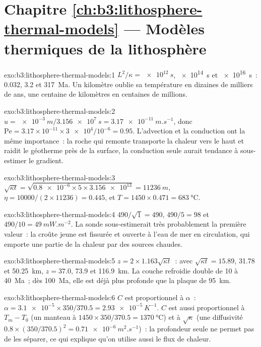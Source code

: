 \section*{Chapitre \ref{ch:b3:lithosphere-thermal-models} --- Modèles thermiques de la lithosphère}

\begin{solution}{exo:b3:lithosphere-thermal-models:1}
$L^2/\kappa = \qty{e12}{s}$, \qty{e14}{s} et \qty{e16}{s}~: 0.032, 3.2 et
\qty{317}{Ma}. Un kilomètre oublie sa température en dizaines de milliers de
ans, une centaine de kilomètres en centaines de millions.
\end{solution}

\begin{solution}{exo:b3:lithosphere-thermal-models:2}
$u = \qty{e-3}{m}/\qty{3.156e7}{s} = \qty{3.17e-11}{m.s^{-1}}$, donc
$\mathrm{Pe} = 3.17\times10^{-11}\times\num{3e4}/10^{-6} = 0.95$. L'advection et
la conduction ont la même importance~: la roche qui remonte transporte la chaleur vers le haut
et raidit le géotherme près de la surface, la conduction seule
aurait tendance à sous-estimer le gradient.
\end{solution}

\begin{solution}{exo:b3:lithosphere-thermal-models:3}
$\sqrt{\kappa t} = \sqrt{\num{0.8e-6}\times5\times\num{3.156e13}} =
\qty{11236}{m}$, $\eta = 10000/(2\times11236) = 0.445$, et $T = 1450\times0.471
= \qty{683}{\celsius}$.
\end{solution}

\begin{solution}{exo:b3:lithosphere-thermal-models:4}
$490/\sqrt1 = 490$, $490/5 = 98$ et $490/10 = \qty{49}{mW.m^{-2}}$. La sonde
sous-estimerait très probablement la première valeur~: la croûte jeune est fissurée et ouverte à
l'eau de mer en circulation, qui emporte une partie de la chaleur par des sources chaudes.
\end{solution}

\begin{solution}{exo:b3:lithosphere-thermal-models:5}
$z = 2\times1.163\sqrt{\kappa t}$~: avec $\sqrt{\kappa t} = 15.89$, 31.78 et
\qty{50.25}{km}, $z = 37.0$, 73.9 et \qty{116.9}{km}. La couche refroidie double
de 10 à \qty{40}{Ma}~; dès \qty{100}{Ma}, elle est déjà plus profonde
que la plaque de \qty{95}{km}.
\end{solution}

\begin{solution}{exo:b3:lithosphere-thermal-models:6}
$C$ est proportionnel à $\alpha$~: $\alpha = \num{3.1e-5}\times350/370.5 =
\qty{2.93e-5}{K^{-1}}$. $C$ est aussi proportionnel à $T_m - T_0$ (un manteau à
$1450\times350/370.5 = \qty{1370}{\celsius}$) et à $\sqrt\kappa$ (une
diffusivité $0.8\times(350/370.5)^2 = \qty{0.71e-6}{m^2.s^{-1}}$)~: la profondeur seule
ne permet pas de les séparer, ce qui explique qu'on utilise aussi le flux de chaleur.
\end{solution}

